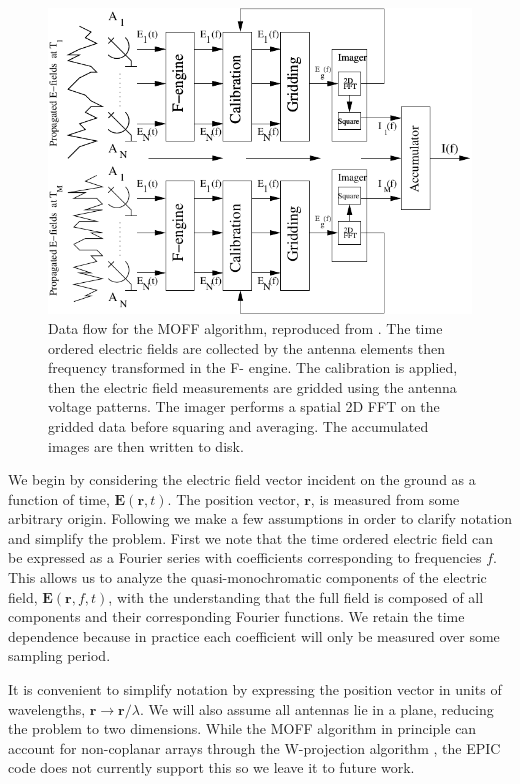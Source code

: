 \documentclass[a4paper,fleqn,usenatbib]{mnras}
\begin{document}
\begin{figure}
\begin{center}
\includegraphics[width=\columnwidth]{fig1.pdf}
\caption{Data flow for the MOFF algorithm, reproduced from \citealt{thy15c}. The time ordered 
electric fields are collected by the antenna elements then frequency transformed in the F-
engine. The calibration is applied, then the electric field measurements are gridded using the 
antenna voltage patterns. The imager performs a spatial 2D FFT on the gridded data before 
squaring and averaging. The accumulated images are then written to disk.}
\label{fig:moff_flow}
\end{center}
\end{figure}

We begin by considering the electric field vector incident on the ground as a function of time, 
$\mathbf{E}(\mathbf{r},t)$. The position vector, $\mathbf{r}$, is measured from some arbitrary 
origin. Following \citealt{cla99} we make a few assumptions in order to clarify notation and 
simplify the problem. First we note that the time ordered electric field can be expressed as a 
Fourier series with coefficients corresponding to frequencies $f$. This allows us to analyze the 
quasi-monochromatic components of the electric field, $\mathbf{E}(\mathbf{r},f,t)$, with the 
understanding that the full field is composed of all components and their corresponding Fourier 
functions. We retain the time dependence because in practice each coefficient will only be 
measured over some sampling period. 

It is convenient to simplify notation by expressing the position vector in units of wavelengths, 
$\mathbf{r}\rightarrow \mathbf{r}/\lambda$. We will also assume all antennas lie in a plane, 
reducing the problem to two dimensions. While the MOFF algorithm in principle can account for 
non-coplanar arrays through the W-projection algorithm \citep{cor08}, the EPIC code does not 
currently support this so we leave it to future work.
\end{document}

